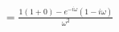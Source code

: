 \documentclass[preview]{standalone}
\begin{document}
\begin{align*}
&=\frac{1(1+0)-e^{-i\omega}(1-i\omega)}{\omega^{2}} \\
\end{align*}
\end{document}
